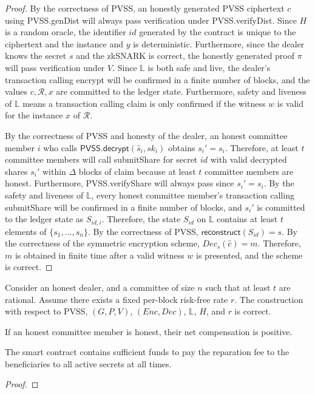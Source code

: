 \begin{proof}
    By the correctness of PVSS, an honestly generated PVSS ciphertext $c$ using \textsf{PVSS.genDist} will always pass verification under \textsf{PVSS.verifyDist}.
    Since $H$ is a random oracle, the identifier $id$ generated by the contract is unique to the ciphertext and the instance and $y$ is deterministic.
    Furthermore, since the dealer knows the secret $s$ and the zkSNARK is correct, the honestly generated proof $\pi$ will pass verification under $V$. 
    Since $\mathbb{L}$ is both safe and live, the dealer's transaction calling \textsf{encrypt} will be confirmed in a finite number of blocks, and the values $c, \mathcal{R}, x$ are committed to the ledger state.
    Furthermore, safety and liveness of $\mathbb{L}$ means a transaction calling \textsf{claim} is only confirmed if the witness $w$ is valid for the instance $x$ of $\mathcal{R}$.

    By the correctness of PVSS and honesty of the dealer, an honest committee member $i$ who calls $\textsf{PVSS.decrypt}(\hat{s}_i, sk_i)$ obtains $s_i' = s_i$.
    Therefore, at least $t$ committee members will call \textsf{submitShare} for secret $id$ with valid decrypted shares $s_i'$ within $\Delta$ blocks of \textsf{claim} because at least $t$ committee members are honest.
    Furthermore, \textsf{PVSS.verifyShare} will always pass since $s_i' = s_i$.
    By the safety and liveness of $\mathbb{L}$, every honest committee member's transaction calling \textsf{submitShare} will be confirmed in a finite number of blocks, and $s_i'$ is committed to the ledger state as $S_{id,i}$.
    Therefore, the state $S_{id}$ on $\mathbb{L}$ contains at least $t$ elements of $\{s_1, \dots, s_n\}$.
    By the correctness of PVSS, $\textsf{reconstruct}(S_{id}) = s$.
    By the correctness of the symmetric encryption scheme, $Dec_s(\hat{c}) = m$.
    Therefore, $m$ is obtained in finite time after a valid witness $w$ is presented, and the scheme is correct.
\end{proof}
\begin{theorem}
    Consider an honest dealer, and a committee of size $n$ such that at least $t$ are rational.
    Assume there exists a fixed per-block risk-free rate $r$.
    The construction with respect to \textsf{PVSS}, $(G, P, V)$, $(Enc, Dec)$, $\mathbb{L}$, $H$, and $r$ is correct.
\end{theorem}
\begin{lemma}
    If an honest committee member is honest, their net compensation is positive.
\end{lemma}
\begin{lemma}
    The smart contract contains sufficient funds to pay the reparation fee to the beneficiaries to all active secrets at all times.
\end{lemma}
\begin{proof}
\end{proof}